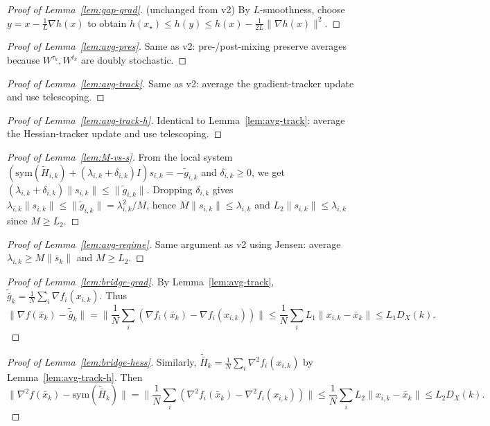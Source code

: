 \documentclass[11pt,a4paper]{article}
\begin{document}
\begin{proof}[Proof of Lemma~\ref{lem:gap-grad}]
	(unchanged from v2)
	By $L$-smoothness, choose $y=x-\frac{1}{L}\nabla h(x)$ to obtain
	$h(x_\star)\le h(y)\le h(x)-\frac{1}{2L}\|\nabla h(x)\|^2$.
\end{proof}

\begin{proof}[Proof of Lemma~\ref{lem:avg-pres}]
	Same as v2: pre-/post-mixing preserve averages because $W^{\tau_k},W^{t_k}$ are doubly stochastic.
\end{proof}

\begin{proof}[Proof of Lemma~\ref{lem:avg-track}]
	Same as v2: average the gradient-tracker update and use telescoping.
\end{proof}

\begin{proof}[Proof of Lemma~\ref{lem:avg-track-h}]
	Identical to Lemma~\ref{lem:avg-track}: average the Hessian-tracker update and use telescoping.
\end{proof}

\begin{proof}[Proof of Lemma~\ref{lem:M-vs-s}]
	From the local system
	$(\mathrm{sym}(\tilde H_{i,k})+(\lambda_{i,k}+\delta_{i,k})I)s_{i,k}=-\tilde g_{i,k}$ and
	$\delta_{i,k}\ge 0$, we get
	$(\lambda_{i,k}+\delta_{i,k})\|s_{i,k}\|\le \|\tilde g_{i,k}\|$.
	Dropping $\delta_{i,k}$ gives $\lambda_{i,k}\|s_{i,k}\|\le \|\tilde g_{i,k}\|=\lambda_{i,k}^2/M$,
	hence $M\|s_{i,k}\|\le \lambda_{i,k}$ and $L_2\|s_{i,k}\|\le \lambda_{i,k}$ since $M\ge L_2$.
\end{proof}

\begin{proof}[Proof of Lemma~\ref{lem:avg-regime}]
	Same argument as v2 using Jensen: average $\lambda_{i,k}\ge M\|\bar s_k\|$ and $M\ge L_2$.
\end{proof}

\begin{proof}[Proof of Lemma~\ref{lem:bridge-grad}]
	By Lemma~\ref{lem:avg-track},
	$\tilde{\bar g}_k=\frac1N\sum_i\nabla f_i(x_{i,k})$.
	Thus
	\[
	\|\nabla f(\bar x_k)-\tilde{\bar g}_k\|
	=\Big\|\frac1N\sum_i(\nabla f_i(\bar x_k)-\nabla f_i(x_{i,k}))\Big\|
	\le \frac1N\sum_i L_1\|x_{i,k}-\bar x_k\|
	\le L_1 D_X(k).
	\]
\end{proof}

\begin{proof}[Proof of Lemma~\ref{lem:bridge-hess}]
	Similarly,
	$\tilde{\bar H}_k=\frac1N\sum_i\nabla^2 f_i(x_{i,k})$ by Lemma~\ref{lem:avg-track-h}.
	Then
	\[
	\|\nabla^2 f(\bar x_k)-\mathrm{sym}(\tilde{\bar H}_k)\|
	=\Big\|\frac1N\sum_i(\nabla^2 f_i(\bar x_k)-\nabla^2 f_i(x_{i,k}))\Big\|
	\le \frac1N\sum_i L_2\|x_{i,k}-\bar x_k\|
	\le L_2 D_X(k).
	\]
\end{proof}
\end{document}
